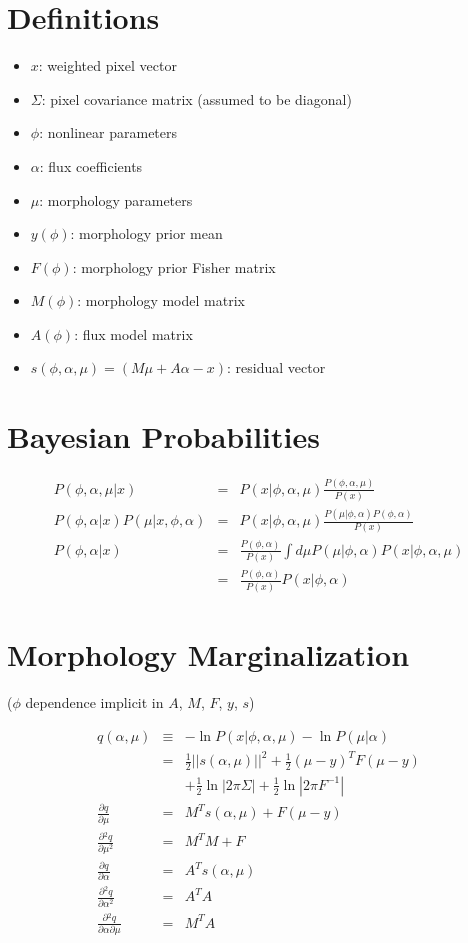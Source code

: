 \documentclass{amsart}
\newcommand{\Dp}[2]{\ensuremath{\frac{\partial{#1}}{\partial{#2}}}}
\begin{document}
\section{Definitions}

\begin{itemize}
\item $x$: weighted pixel vector
\item $\Sigma$: pixel covariance matrix (assumed to be diagonal)
\item $\phi$: nonlinear parameters
\item $\alpha$: flux coefficients
\item $\mu$: morphology parameters
\item $y(\phi)$: morphology prior mean
\item $F(\phi)$: morphology prior Fisher matrix
\item $M(\phi)$: morphology model matrix
\item $A(\phi)$: flux model matrix
\item $s(\phi,\alpha,\mu) = (M\mu + A\alpha - x)$: residual vector
\end{itemize}

\section{Bayesian Probabilities}

\begin{eqnarray}
  P(\phi,\alpha,\mu|x) &=& P(x|\phi,\alpha,\mu)
  \frac{P(\phi,\alpha,\mu)}{P(x)} \\
  P(\phi,\alpha|x)P(\mu|x,\phi,\alpha) &=&
  P(x|\phi,\alpha,\mu)\frac{P(\mu|\phi,\alpha) P(\phi,\alpha)}{P(x)}
  \\
  P(\phi,\alpha|x) &=& \frac{P(\phi,\alpha)}{P(x)}
  \int d\mu P(\mu|\phi,\alpha) P(x|\phi,\alpha,\mu) \\
  &=& \frac{P(\phi,\alpha)}{P(x)} P(x|\phi,\alpha)
\end{eqnarray}

\section{Morphology Marginalization}

($\phi$ dependence implicit in $A$, $M$, $F$, $y$, $s$)

\begin{eqnarray}
  q(\alpha,\mu) &\equiv& -\ln P(x|\phi,\alpha,\mu) 
  - \ln P(\mu|\alpha) \\ &=& 
  \frac{1}{2}||s(\alpha,\mu)||^2
  + \frac{1}{2} \left(\mu - y\right)^T\! 
  F \left(\mu - y\right) \\
  & & + \frac{1}{2}\ln\left|2\pi\Sigma\right|
  + \frac{1}{2}\ln\left|2\pi F^{-1}\right| \\
  \Dp{q}{\mu} &=& M^T\!s(\alpha,\mu) + F \left(\mu - y\right) \\
  \Dp{^2q}{\mu^2} &=& M^T\!M + F \\
  \Dp{q}{\alpha} &=& A^T\!s(\alpha,\mu) \\
  \Dp{^2q}{\alpha^2} &=& A^T\!A \\
  \Dp{^2q}{\alpha\partial\mu} &=& M^T\!A 
\end{eqnarray}
\end{document}
